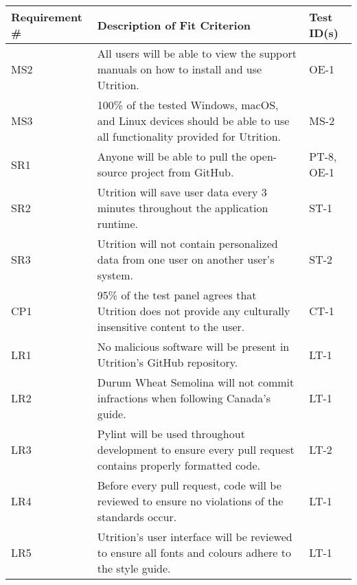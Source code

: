 \documentclass[12pt, titlepage]{article}
\begin{document}
	\begin{table}[H]
		\begin{tabularx}{\textwidth}{|l|X|l|}
			\hline
			{\bf Requirement \#} & {\bf Description of Fit Criterion} & {\bf Test ID(s)}\\
			\hline
			MS2 & All users will be able to view the support manuals on how to install and use Utrition. & OE-1\\
			\hline
			MS3 & 100\% of the tested Windows, macOS, and Linux devices should be able to use all functionality provided for Utrition. & MS-2\\
			\hline
			SR1 & Anyone will be able to pull the open-source project from GitHub. & PT-8, OE-1 \\
			\hline
			SR2 & Utrition will save user data every 3 minutes throughout the 
			application runtime. & ST-1\\
			\hline
			SR3 & Utrition will not contain personalized data from one user on another user's system. & ST-2\\
			\hline
			CP1 & 95\% of the test panel agrees that Utrition does not provide any culturally insensitive content to the user. & CT-1\\
			\hline
			LR1 & No malicious software will be present in Utrition’s GitHub repository. & LT-1\\
			\hline
			LR2 & Durum Wheat Semolina will not commit infractions when following Canada’s guide. & LT-1\\
			\hline
			LR3 & Pylint will be used throughout development to ensure every pull request contains properly formatted code. & LT-2\\
			\hline
			LR4 & Before every pull request, code will be reviewed to ensure no violations of the standards occur.  & LT-1\\
			\hline
			LR5 & Utrition's user interface will be reviewed to ensure all fonts and colours adhere to the style guide.  & LT-1\\
			\hline
		\end{tabularx}
	\end{table}
\end{document}
